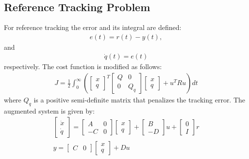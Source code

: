 \subsection*{Reference Tracking Problem}
For reference tracking the error and its integral are defined:
\begin{align*}
e(t) = r(t) - y(t),
\end{align*}
and
\begin{align*}
\dot{q}(t)= e(t)
\end{align*}
respectively. The cost function is modified as follows:
\begin{align*}
J=\frac{1}{2}\int_{0}^{\infty} \left(\begin{bmatrix}x\\q
\end{bmatrix}^T\begin{bmatrix}Q & 0\\0 & Q_q
\end{bmatrix}\begin{bmatrix}x\\q
\end{bmatrix} + u^T R u \right) dt
\end{align*}
where \( Q_q \) is a positive semi-definite matrix that penalizes the tracking error. The augmented system is given by:
\begin{align*}
\begin{bmatrix}\dot{x}\\\dot{q}
\end{bmatrix}=\begin{bmatrix}A & 0\\-C & 0
\end{bmatrix}\begin{bmatrix}x\\q
\end{bmatrix}+\begin{bmatrix}B\\-D
\end{bmatrix}u+\begin{bmatrix}0\\I
\end{bmatrix}r\\
y=\begin{bmatrix}C & 0\end{bmatrix}\begin{bmatrix}x\\q
\end{bmatrix}+Du
\end{align*}

